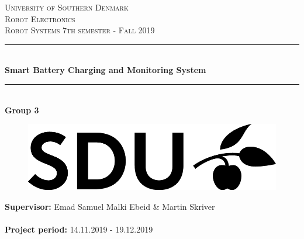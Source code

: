 \documentclass[report.tex]{subfiles}
\begin{document}
\begin{titlepage}
\begin{center}
\textsc{\LARGE University of Southern Denmark}\\[1.5cm]

\textsc{Robot Electronics}\\[0.5cm]

\textsc{\large Robot Systems 7th semester - Fall 2019}\\[0.5cm]
\rule{\linewidth}{0.5mm}\\[0.4cm]
{ \LARGE \bfseries Smart Battery Charging and Monitoring System \\[0.4cm]}
\rule{\linewidth}{0.5mm}\\[1.2cm]


\textbf{Group 3} \\ [1cm]


\vfill
\begin{figure}[H]
\centering
\includegraphics[scale=0.8]{figures/SDU_BLACK_RGB_png.png}
\end{figure}
\vfill

\textbf{Supervisor:} Emad Samuel Malki Ebeid \& Martin Skriver \\ \mbox{}\\
\textbf{Project period:} 14.11.2019 - 19.12.2019
\end{center}
\end{titlepage}
\end{document}
